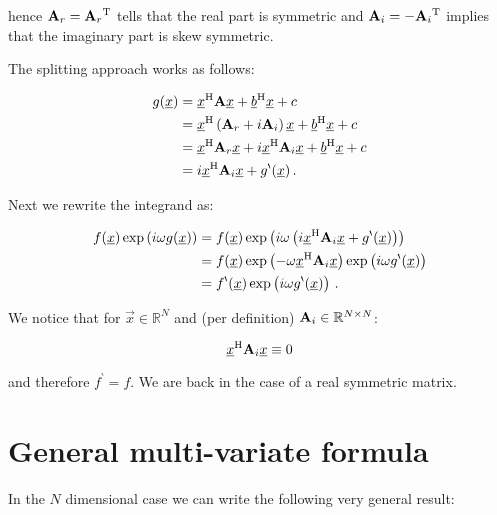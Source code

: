 \documentclass[a4paper,10pt]{article}
\begin{document}
hence $\mathbf{A}_r = \mathbf{A}_r{}^{\textnormal{T}}$ tells that the real part is symmetric
and $\mathbf{A}_i = -\mathbf{A}_i{}^{\textnormal{T}}$ implies that the imaginary part is skew
symmetric.

The splitting approach works as follows:

\begin{equation}
\begin{split}
 g(\underline{x}) & = \underline{x}{}^{\textnormal{H}} \mathbf{A} \underline{x} + \underline{b}{}^{\textnormal{H}} \underline{x} + c \\
            & = \underline{x}{}^{\textnormal{H}} \left(\mathbf{A}_r + i \mathbf{A}_i\right) \underline{x} + \underline{b}{}^{\textnormal{H}} \underline{x} + c \\
            & = \underline{x}{}^{\textnormal{H}} \mathbf{A}_r \underline{x} + i \underline{x}{}^{\textnormal{H}} \mathbf{A}_i \underline{x} + \underline{b}{}^{\textnormal{H}} \underline{x} + c \\
            & = i \underline{x}{}^{\textnormal{H}} \mathbf{A}_i \underline{x} + g^\backprime(\underline{x}) \,.
\end{split}
\end{equation}

Next we rewrite the integrand as:

\begin{equation}
\begin{split}
 f(\underline{x}) \exp\left(i \omega g(\underline{x})\right)
 & = f(\underline{x}) \exp\left(i \omega \left(i \underline{x}{}^{\textnormal{H}} \mathbf{A}_i \underline{x} + g^\backprime(\underline{x})\right)\right) \\
 & = f(\underline{x}) \exp\left(- \omega \underline{x}{}^{\textnormal{H}} \mathbf{A}_i \underline{x}\right)
                \exp\left(i \omega g^\backprime(\underline{x})\right) \\
 & = f^\backprime(\underline{x}) \exp\left(i \omega g^\backprime(\underline{x})\right) \,.
\end{split}
\end{equation}

We notice that for $\vec{x} \in \mathbb{R}^N$ and (per definition)
$\mathbf{A}_i \in \mathbb{R}^{N \times N}$:

\begin{equation}
 \underline{x}{}^{\textnormal{H}} \mathbf{A}_i \underline{x} \equiv 0
\end{equation}

and therefore $f^\backprime = f$. We are back in the case of a real
symmetric matrix.


\section{General multi-variate formula}


In the $N$ dimensional case we can write the following very general result:
\end{document}
